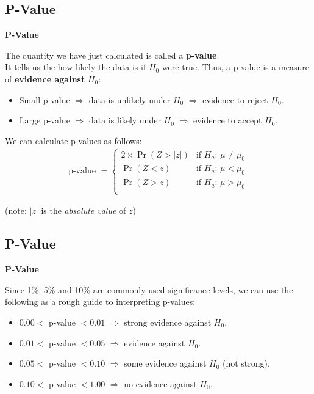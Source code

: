 \documentclass[compress]{beamer}        %
\makeatletter
\newcommand{\tcb}{\textcolor{beamer@blendedblue}}
\makeatother
\begin{document}
\subsection{P-Value}
\begin{frame}{\bf \tcb{P-Value}}

The quantity we have just calculated is called a {\bf p-value}.\\[0.4cm]

It tells us the how likely the data is if $H_0$ were true. Thus, a p-value is a measure of {\bf evidence against} {\boldmath$H_0$}:\\[0.2cm]
\begin{itemize}\itemsep0.3cm
\item Small p-value $\Rightarrow$ data is unlikely under $H_0$ $\Rightarrow$ evidence to reject $H_0$.
\item Large p-value $\Rightarrow$ data is likely under $H_0$ $\Rightarrow$ evidence to accept $H_0$.\\[0.5cm]
\end{itemize}

We can calculate p-values as follows:
\begin{align*}
\boxed{\text{p-value } = \left\{
\begin{array}{rl}
2 \times \Pr(Z > |z|) & \text{if }  H_a: \, \mu \ne \mu_0\\[0.2cm]
\Pr(Z < z) & \text{if } H_a: \, \mu < \mu_0\\[0.2cm]
\Pr(Z > z) & \text{if } H_a: \, \mu > \mu_0\\
\end{array} \right.}
\end{align*}

{\footnotesize(note: $|z|$ is the \emph{absolute value} of $z$)}

\end{frame}




\subsection{P-Value}
\begin{frame}{\bf \tcb{P-Value}}

Since 1\%, 5\% and 10\% are commonly used significance levels, we can use the following as a rough guide to interpreting p-values:\\[0.3cm]

\begin{itemize}\itemsep0.6cm
\item $0.00 <$ p-value $< 0.01$ $\Rightarrow$ strong evidence against $H_0$.
\item $0.01 <$ p-value $< 0.05$ $\Rightarrow$  evidence against $H_0$.
\item $0.05 <$ p-value $< 0.10$ $\Rightarrow$  some evidence against $H_0$ (not strong).
\item $0.10 <$ p-value $< 1.00$ $\Rightarrow$  no evidence against $H_0$.
\end{itemize}


\end{frame}
\end{document}
